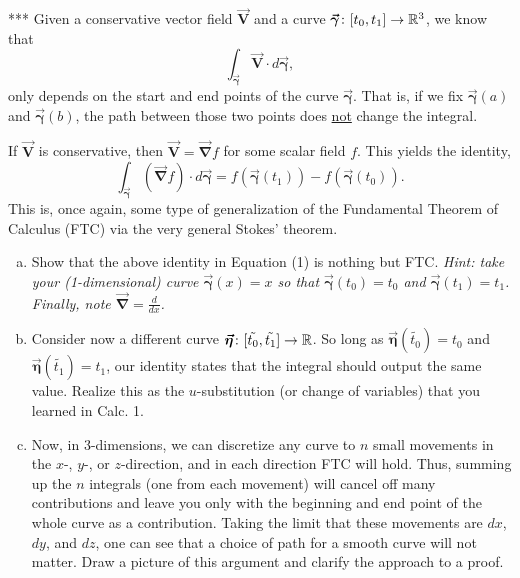 \documentclass[12pt]{article} %
\newcommand{\vecfieldV}{\boldsymbol{\vec{V}}}
\newcommand{\curvegamma}{\boldsymbol{\vec{\gamma}}}
\newcommand{\grad}{\boldsymbol{\vec{\nabla}}}
\newcommand{\curveeta}{\boldsymbol{\vec{\eta}}}
\begin{document}
\begin{problem} ***
    Given a conservative vector field $\vecfieldV$ and a curve $\curvegamma \colon [t_0,t_1]\to \R^3$, we know that 
    \[
    \int_{\curvegamma} \vecfieldV\cdot d\curvegamma,
    \]
    only depends on the start and end points of the curve $\curvegamma$.  That is, if we fix $\curvegamma(a)$ and $\curvegamma(b)$, the path between those two points does \underline{not} change the integral.
    
    If $\vecfieldV$ is conservative, then $\vecfieldV = \grad f$ for some scalar field $f$.  This yields the identity,
    \begin{equation}
    \int_{\curvegamma} \left(\grad f\right) \cdot d\curvegamma = f(\curvegamma(t_1))-f(\curvegamma(t_0)).
    \end{equation}
    This is, once again, some type of generalization of the Fundamental Theorem of Calculus (FTC) via the very general Stokes' theorem.
    \begin{enumerate}[(a)]
        \item Show that the above identity in Equation (1) is nothing but FTC.  \emph{Hint: take your (1-dimensional) curve $\curvegamma(x)=x$ so that $\curvegamma(t_0)=t_0$ and $\curvegamma(t_1)=t_1$. Finally, note $\grad = \frac{d}{dx}$.}
        \item Consider now a different curve $\curveeta \colon [\tilde{t_0},\tilde{t_1}]\to \R$. So long as $\curveeta(\tilde{t_0})=t_0$ and $\curveeta(\tilde{t_1})=t_1$, our identity states that the integral should output the same value.  Realize this as the $u$-substitution (or change of variables) that you learned in Calc. 1.
        \item Now, in 3-dimensions, we can discretize any curve to $n$ small movements in the $x$-, $y$-, or $z$-direction, and in each direction FTC will hold.  Thus, summing up the $n$ integrals (one from each movement) will cancel off many contributions and leave you only with the beginning and end point of the whole curve as a contribution.  Taking the limit that these movements are $dx$, $dy$, and $dz$, one can see that a choice of path for a smooth curve will not matter.  Draw a picture of this argument and clarify the approach to a proof.
    \end{enumerate}
\end{problem}
\end{document}
